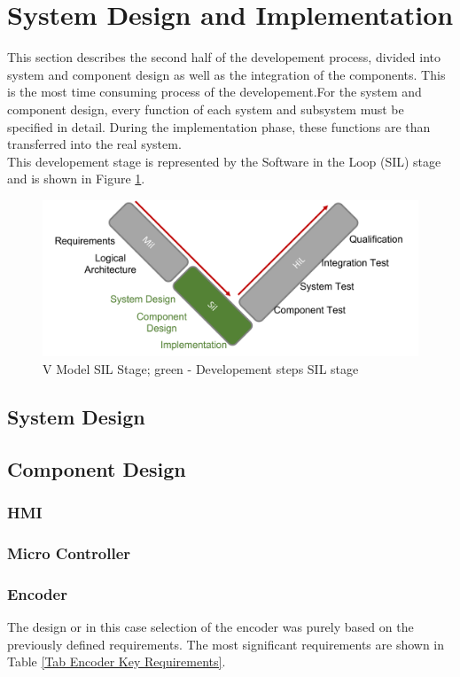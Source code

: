 \section{System Design and Implementation}
This section describes the second half of the developement process, divided into system and component design as well as the integration of the components. This is the most time consuming process of the developement.For the system and component design, every function of each system and subsystem must be specified in detail. During the implementation phase, these functions are than transferred into the real system.\\
This developement stage is represented by the Software in the Loop (SIL) stage and is shown in Figure \ref{V Model System Design}.

\begin{figure}[h!]
    \begin{center}
    \includegraphics[width=12cm]{Pictures/V Model System Design.png}
    \caption[V Model System Design]{V Model SIL Stage; green - Developement steps SIL stage}
    \label{V Model System Design}
    \end{center}
\end{figure}

\subsection{System Design}

\subsection{Component Design}
\subsubsection{HMI}
\subsubsection{Micro Controller}
\subsubsection{Encoder}
The design or in this case selection of the encoder was purely based on the previously defined requirements. The most significant requirements are shown in Table \ref{Tab Encoder Key Requirements}.


